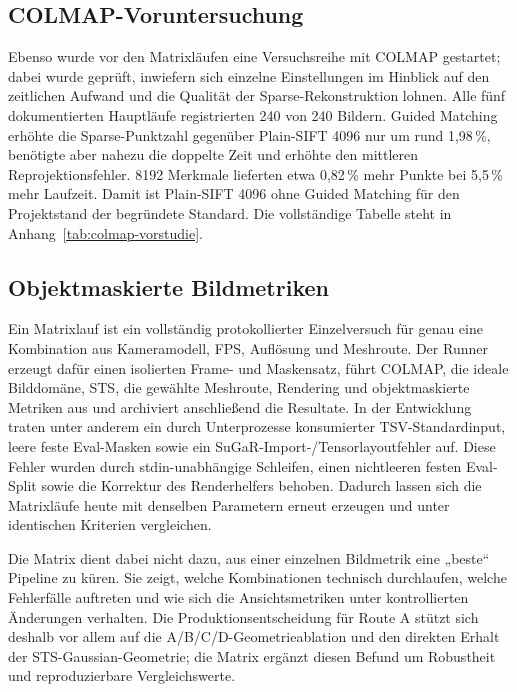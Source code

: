 \subsection{COLMAP-Voruntersuchung}

Ebenso wurde vor den Matrixläufen eine Versuchsreihe mit COLMAP gestartet;
dabei wurde geprüft, inwiefern sich einzelne Einstellungen im Hinblick auf den
zeitlichen Aufwand und die Qualität der Sparse-Rekonstruktion lohnen. Alle
fünf dokumentierten Hauptläufe registrierten 240 von 240 Bildern. Guided
Matching erhöhte die Sparse-Punktzahl gegenüber Plain-SIFT 4096 nur um rund
1,98\,\%, benötigte aber nahezu die doppelte Zeit und erhöhte den mittleren
Reprojektionsfehler. 8192 Merkmale lieferten etwa 0,82\,\% mehr Punkte bei
5,5\,\% mehr Laufzeit. Damit ist Plain-SIFT 4096 ohne Guided Matching für den
Projektstand der begründete Standard. Die vollständige Tabelle steht in
Anhang~\ref{tab:colmap-vorstudie}.

\subsection{Objektmaskierte Bildmetriken}

Ein Matrixlauf ist ein vollständig protokollierter Einzelversuch für genau
eine Kombination aus Kameramodell, FPS, Auflösung und Meshroute. Der Runner
erzeugt dafür einen isolierten Frame- und Maskensatz, führt COLMAP, die ideale
Bilddomäne, STS, die gewählte Meshroute, Rendering und objektmaskierte
Metriken aus und archiviert anschließend die Resultate. In der Entwicklung
traten unter anderem ein durch Unterprozesse konsumierter TSV-Standardinput,
leere feste Eval-Masken sowie ein SuGaR-Import-/Tensorlayoutfehler auf. Diese
Fehler wurden durch stdin-unabhängige Schleifen, einen nichtleeren festen
Eval-Split sowie die Korrektur des Renderhelfers behoben. Dadurch lassen sich
die Matrixläufe heute mit denselben Parametern erneut erzeugen und unter
identischen Kriterien vergleichen.

Die Matrix dient dabei nicht dazu, aus einer einzelnen Bildmetrik eine
„beste“ Pipeline zu küren. Sie zeigt, welche Kombinationen technisch
durchlaufen, welche Fehlerfälle auftreten und wie sich die Ansichtsmetriken
unter kontrollierten Änderungen verhalten. Die Produktionsentscheidung für
Route A stützt sich deshalb vor allem auf die A/B/C/D-Geometrieablation und
den direkten Erhalt der STS-Gaussian-Geometrie; die Matrix ergänzt diesen
Befund um Robustheit und reproduzierbare Vergleichswerte.


